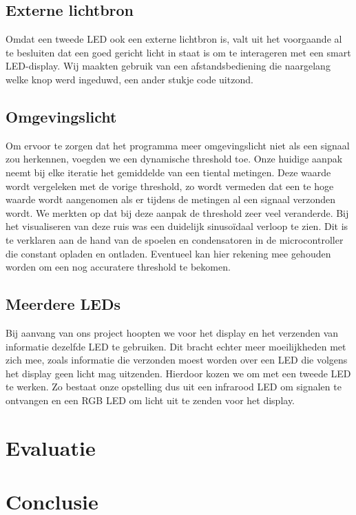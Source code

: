 \documentclass{article}
\begin{document}
\subsection{Externe lichtbron}
Omdat een tweede LED ook een externe lichtbron is, valt uit het voorgaande al te besluiten dat een goed gericht licht in staat is om te interageren met een smart LED-display. Wij maakten gebruik van een afstandsbediening die naargelang welke knop werd ingeduwd, een ander stukje code uitzond.

\subsection{Omgevingslicht}
Om ervoor te zorgen dat het programma meer omgevingslicht niet als een signaal zou herkennen, voegden we een dynamische threshold toe.
Onze huidige aanpak neemt bij elke iteratie het gemiddelde van een tiental metingen. Deze waarde wordt vergeleken met de vorige threshold, zo wordt vermeden dat een te hoge waarde wordt aangenomen als er tijdens de metingen al een signaal verzonden wordt.
We merkten op dat bij deze aanpak de threshold zeer veel veranderde. Bij het visualiseren van deze ruis was een duidelijk sinusoïdaal verloop te zien. Dit is te verklaren aan de hand van de spoelen en condensatoren in de microcontroller die constant opladen en ontladen. Eventueel kan hier rekening mee gehouden worden om een nog accuratere threshold te bekomen.

\subsection{Meerdere LEDs}
Bij aanvang van ons project hoopten we voor het display en het verzenden van informatie dezelfde LED te gebruiken. Dit bracht echter meer moeilijkheden met zich mee, zoals informatie die verzonden moest worden over een LED die volgens het display geen licht mag uitzenden. Hierdoor kozen we om met een tweede LED te werken. Zo bestaat onze opstelling dus uit een infrarood LED om signalen te ontvangen en een RGB LED om licht uit te zenden voor het display.


\section{Evaluatie}


\section{Conclusie}
\end{document}
